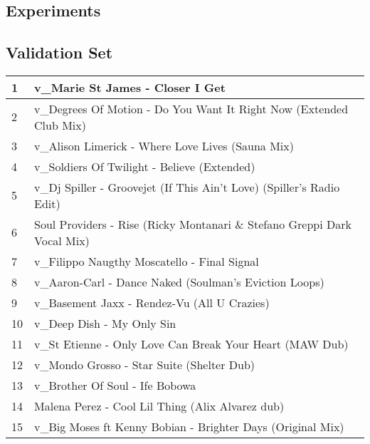 

\begin{appendices}

\chapter{Experiments}


\section{Validation Set}
\label{validationset}
\begin{longtable}{| p{} | p{} |}
\hline 
1 & v{\_}Marie St James - Closer I Get \\
\hline
2 & v{\_}Degrees Of Motion - Do You Want It Right Now (Extended Club Mix) \\
\hline
3 & v{\_}Alison Limerick - Where Love Lives (Sauna Mix) \\
\hline
4 & v{\_}Soldiers Of Twilight - Believe (Extended) \\
\hline
5 & v{\_}Dj Spiller - Groovejet (If This Ain't Love) (Spiller's Radio Edit) \\
\hline
6 & Soul Providers - Rise (Ricky Montanari {\&} Stefano Greppi Dark Vocal Mix) \\
\hline
7 & v{\_}Filippo Naugthy Moscatello - Final Signal \\
\hline
8 & v{\_}Aaron-Carl - Dance Naked (Soulman's Eviction Loops) \\
\hline
9 & v{\_}Basement Jaxx - Rendez-Vu (All U Crazies) \\
\hline
10 & v{\_}Deep Dish - My Only Sin \\
\hline
11 & v{\_}St Etienne - Only Love Can Break Your Heart (MAW Dub) \\
\hline
12 & v{\_}Mondo Grosso - Star Suite (Shelter Dub) \\
\hline
13 & v{\_}Brother Of Soul - Ife Bobowa \\
\hline
14 & Malena Perez - Cool Lil Thing (Alix Alvarez dub)\\
\hline
15 & v{\_}Big Moses ft Kenny Bobian - Brighter Days (Original Mix)\\

\end{longtable}
\end{appendices}
